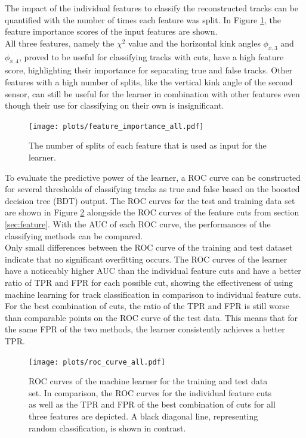 The impact of the individual features to classify the reconstructed tracks can be quantified with the number of times each feature was split.
In Figure \ref{fig:importance}, the feature importance scores of the input features are shown. \\
All three features, namely the $\chi^2$ value and the horizontal kink angles  $\phi_{x,3}$ and $\phi_{x,4}$,
proved to be useful for classifying tracks with cuts, have a high feature score, highlighting their importance for separating true and false tracks.
Other features with a high number of splits, like the vertical kink angle of the second sensor,
can still be useful for the learner in combination with other features even though their use for classifying on their own is insignificant.
\begin{figure}
  \centering
  \texttt{[image: plots/feature\_importance\_all.pdf]}
  \caption{The number of splits of each feature that is used as input for the learner.}
  \label{fig:importance}
\end{figure}

To evaluate the predictive power of the learner, a ROC curve can be constructed for several thresholds of classifying tracks as true and false based on the
boosted decision tree (BDT) output.
The ROC curves for the test and training data set are shown in Figure \ref{fig:auc_comparison} alongside
the ROC curves of the feature cuts from section \ref{sec:feature}.
With the AUC of each ROC curve, the performances of the classifying methods can be compared. \\%
Only small differences between the ROC curve of the training and test dataset indicate that no significant overfitting occurs.
The ROC curves of the learner have a noticeably higher AUC than the individual feature cuts and have a better ratio of
TPR and FPR for each possible cut, showing the effectiveness
of using machine learning for track classification in comparison to individual feature cuts. For the best combination of cuts, the ratio of the TPR and FPR is still worse than
comparable points on the ROC curve of the test data. This means that for the same FPR of the two methods, the learner consistently achieves a better TPR.

\begin{figure}[H]
  \centering
  \texttt{[image: plots/roc\_curve\_all.pdf]}
    \caption{ROC curves of the machine learner for the training and test data set. In comparison, the ROC curves for the individual feature cuts as well as the
    TPR and FPR of the best combination of cuts for all three features are depicted. A black diagonal line, representing random classification, is shown
    in contrast.}
  \label{fig:auc_comparison}
\end{figure}

